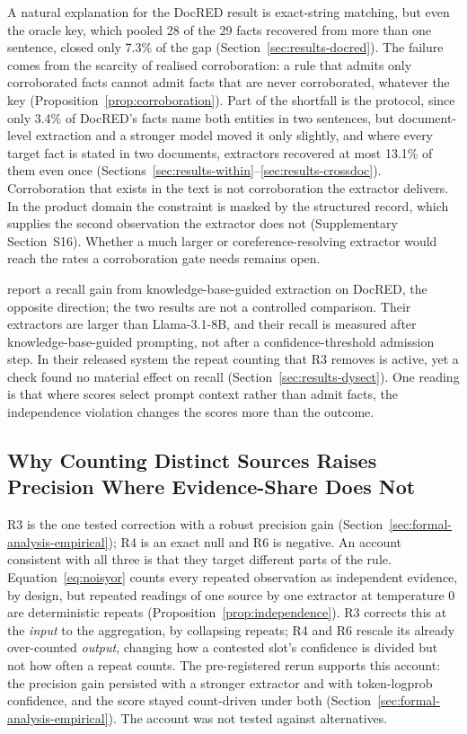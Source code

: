 \documentclass[preprint,12pt,authoryear]{elsarticle}
\begin{document}
A natural explanation for the DocRED result is exact-string matching,
but even the oracle key, which pooled 28 of the 29 facts recovered from
more than one sentence, closed only 7.3\% of the gap
(Section~\ref{sec:results-docred}). The failure comes from the scarcity
of realised corroboration: a rule that admits only corroborated facts
cannot admit facts that are never corroborated, whatever the key
(Proposition~\ref{prop:corroboration}). Part of the shortfall is the
protocol, since only 3.4\% of DocRED's facts name both entities in two
sentences, but document-level extraction and a stronger model moved it
only slightly, and where every target fact is stated in two documents,
extractors recovered at most 13.1\% of them even once
(Sections~\ref{sec:results-within}--\ref{sec:results-crossdoc}).
Corroboration that exists in the text is not corroboration the extractor
delivers. In the product domain the constraint is masked by the structured record,
which supplies the second observation the extractor does not
(Supplementary Section~S16). Whether a much larger or
coreference-resolving extractor would reach the rates a corroboration
gate needs remains open.

\citet{aminnaseri2026dysect} report a recall gain from
knowledge-base-guided extraction on DocRED, the opposite direction; the
two results are not a controlled comparison. Their extractors are larger
than Llama-3.1-8B, and their recall is measured after
knowledge-base-guided prompting, not after a confidence-threshold
admission step. In their released system the repeat counting that R3
removes is active, yet a check found no material effect on recall
(Section~\ref{sec:results-dysect}). One reading is that where scores
select prompt context rather than admit facts, the independence
violation changes the scores more than the outcome.

\subsection{Why Counting Distinct Sources Raises Precision Where Evidence-Share Does Not}
\label{sec:discussion-r3}

R3 is the one tested correction with a robust precision gain
(Section~\ref{sec:formal-analysis-empirical}); R4 is an exact null
and R6 is negative. An account consistent with all three is that they
target different parts of the rule. Equation~\ref{eq:noisyor} counts
every repeated observation as independent evidence, by design, but
repeated readings of one source by one extractor at temperature 0 are
deterministic repeats (Proposition~\ref{prop:independence}). R3 corrects
this at the \emph{input} to the aggregation, by collapsing repeats; R4
and R6 rescale its already over-counted \emph{output}, changing how a
contested slot's confidence is divided but not how often a repeat
counts. The pre-registered rerun supports this account: the precision gain
persisted with a stronger extractor and with token-logprob confidence,
and the score stayed count-driven under both (Section~\ref{sec:formal-analysis-empirical}).
The account was not tested against alternatives.
\end{document}

